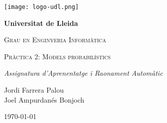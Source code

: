 \documentclass[../informe.tex]{subfiles}
\begin{document}
    \begin{titlepage}
        \centering
        {\texttt{[image: logo-udl.png]}\par}
        \vspace{1cm}
        {\bfseries\LARGE Universitat de Lleida\par}
        \vspace{1cm}
        {\scshape\Large Grau en Enginyeria Informàtica\par}
        \vspace{3cm}
        {\scshape\Huge Pràctica 2: Models probabilístics\par}
        \vspace{3cm}
        {\itshape\Large Assignatura d'Aprenentatge i Raonament Automàtic\par}
        \vfill
        {\large Jordi Farrera Palou \\ Joel Ampurdanés Bonjoch\par}
        \vfill
        {\large \today}
    \end{titlepage}
\end{document}
